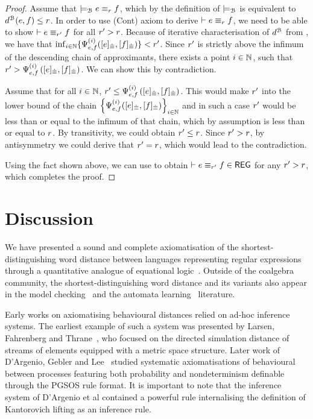 \begin{proof}
    Assume that $ \models_{\mathcal{B}} e \equiv_r f $, which by the definition of $\models_{\mathcal{B}}$ is equivalent to $d^{\mathcal{B}}(e,f) \leq r$. In order to use \textsf{(Cont)} axiom to derive $\vdash e \equiv_r f$, we need to be able to show $\vdash e \equiv_{r'} f$ for all $r' > r$. Because of iterative characterisation of $d^{\mathcal{B}}$ from , we have that $\inf_{i \in \mathbb{N}} \{{\Psi}_{e,f}^{(i)}([e]_{{\mathrel{\dot\equiv}}},[f]_{{\mathrel{\dot\equiv}}})\} < r'$. Since $r'$ is strictly above the infimum of the descending chain of approximants, there exists a point $i \in \mathbb{N}$, such that $r' > {\Psi}_{e,f}^{(i)} \left([e]_{{\mathrel{\dot\equiv}}}, [f]_{{\mathrel{\dot\equiv}}}\right)$. We can show this by contradiction. 
    
    Assume that for all $i \in \mathbb{N}$, $r' \leq {\Psi}_{e,f}^{(i)}\left([e]_{{\mathrel{\dot\equiv}}}, [f]_{{\mathrel{\dot\equiv}}}\right)$. 
     This would make $r'$ into the lower bound of the chain $\left\{{\Psi}_{e,f}^{(i)}([e]_{{\mathrel{\dot\equiv}}}, [f]_{{\mathrel{\dot\equiv}}})\right\}_{i \in \mathbb{N}}$ and in such a case $r'$ would be less than or equal to the infimum of that chain, which by assumption is less than or equal to $r$. By transitivity, we could obtain $r' \leq r$. Since $r' > r$, by antisymmetry we could derive that $r'= r$, which would lead to the contradiction. 

    Using the fact shown above, we can use  to obtain $\vdash e \equiv_{r'} f \in \mathsf{REG}$ for any $r' > r$, which completes the proof.
\end{proof}
\section{Discussion}\label{c2:sec:discussion}
We have presented a sound and complete axiomatisation of the shortest-distinguishing word distance between languages representing regular expressions through a quantitative analogue of equational logic~\cite{Mardare:2016:Quantitative}. Outside of the coalgebra community, the shortest-distinguishing word distance and its variants also appear in the model checking~\cite{Kwiatkowska:1990:Metric} and the automata learning~\cite{Ferreira:2022:Tree} literature.

Early works on axiomatising behavioural distances relied on ad-hoc inference systems. The earliest example of such a system was presented by Larsen, Fahrenberg and Thrane~\cite{Larsen:2011:Metrics}, who focused on the directed simulation distance of streams of elements equipped with a metric space structure. Later work of D'Argenio, Gebler and Lee~\cite{Argenio:2014:Axiomatizing} studied systematic axiomatisations of behavioural between processes featuring both probability and nondeterminism definable through the PGSOS rule format. It is important to note that the inference system of D'Argenio et al contained a powerful rule internalising the definition of Kantorovich lifting as an inference rule.

